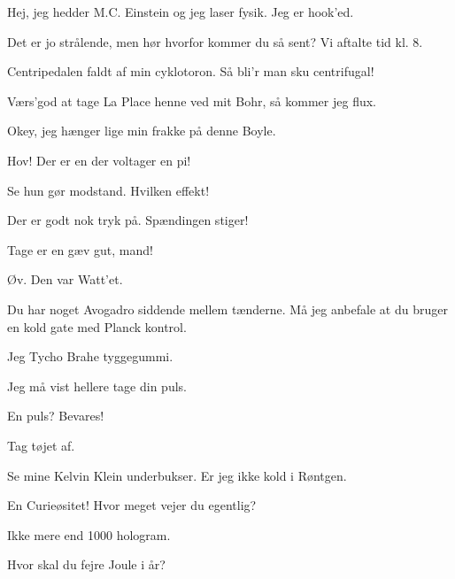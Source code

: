 \documentclass[11pt]{article}
\begin{document}
\begin{sketch}

 Hej, jeg hedder M.C. {\sc Einstein} og jeg {\sc laser}
fysik.  Jeg er {\sc hook}'ed.

 Det er jo {\sc strålende}, men hør hvorfor kommer du så sent?
Vi aftalte tid kl. 8.

 {\sc Centripedalen} faldt af min {\sc cyklotoron}. 
Så bli'r man sku {\sc centrifugal}!

 Værs'god at tage {\sc La Place} henne ved mit {\sc Bohr}, 
så kommer jeg {\sc flux}.

 Okey, jeg hænger lige min frakke på denne {\sc Boyle}.


 Hov! Der er en der {\sc volt}ager en {\sc pi}!

 Se hun gør {\sc modstand}. Hvilken {\sc effekt}!

 Der er godt nok {\sc tryk} på. {\sc Spændingen} stiger! 

 Tage er en gæv gut, mand!

 Øv. Den var {\sc Watt}'et.


 Du har noget {\sc Avogadro} siddende mellem tænderne.
Må jeg anbefale at du bruger en kold {\sc gate} med 
{\sc Planck} kontrol.

 Jeg {\sc Tycho Brahe} tyggegummi.

 Jeg må vist hellere tage din puls.

 En puls? Bevares!

 Tag tøjet af.


 Se mine {\sc Kelvin} Klein underbukser.
Er jeg ikke kold i {\sc Røntgen}.

 En {\sc Curie}øsitet! Hvor meget vejer du egentlig?

 Ikke mere end 1000 {\sc hologram}.


 Hvor skal du fejre {\sc Joule} i år?



\end{sketch}
\end{document}
